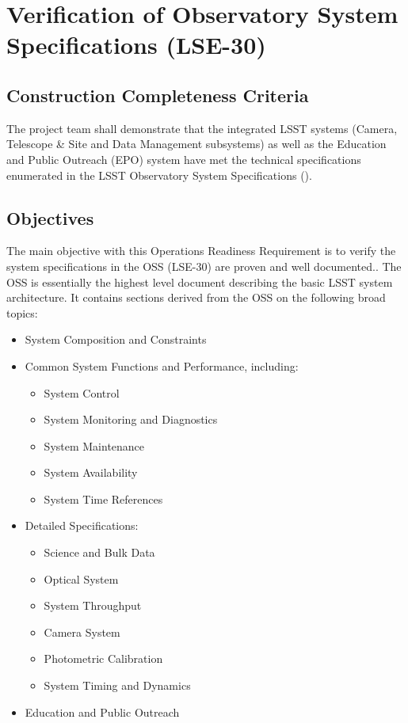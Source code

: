 \section{Verification of Observatory System Specifications (LSE-30)}  \label{sec:oss}

\subsection{Construction Completeness Criteria}
The project team shall demonstrate that the integrated LSST systems (Camera, Telescope \& Site and Data Management subsystems) as well as the Education and Public Outreach (EPO) system have met the technical specifications enumerated in the LSST Observatory System Specifications ().

\subsection{Objectives}

The main objective with this Operations Readiness Requirement is to verify the system specifications in the OSS (LSE-30) are proven and well documented..  The OSS is essentially the highest level document describing the basic LSST system architecture.  It contains sections derived from the OSS on the following broad topics:

\begin{itemize}
\item System Composition and Constraints

\item Common System Functions and Performance, including:

	\begin{itemize}
		\item System Control
		\item System Monitoring and Diagnostics
		\item System Maintenance
		\item System Availability
		\item System Time References
	\end{itemize}

\item Detailed Specifications:

	\begin{itemize}
		\item Science and Bulk Data
		\item Optical System
		\item System Throughput
		\item Camera System
		\item Photometric Calibration
		\item System Timing and Dynamics
	\end{itemize}
	
\item Education and Public Outreach

\end{itemize}

